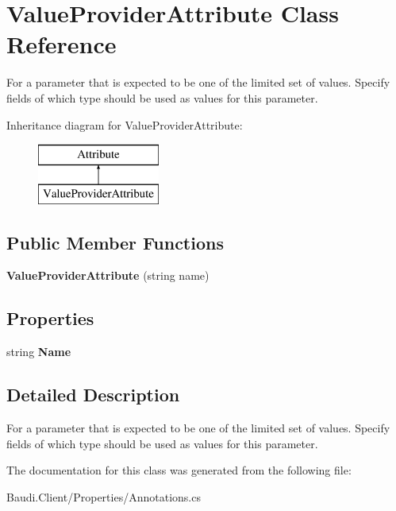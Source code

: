 \hypertarget{class_value_provider_attribute}{}\section{Value\+Provider\+Attribute Class Reference}
\label{class_value_provider_attribute}


For a parameter that is expected to be one of the limited set of values. Specify fields of which type should be used as values for this parameter.  


Inheritance diagram for Value\+Provider\+Attribute\+:\begin{figure}[H]
\begin{center}
\leavevmode
\includegraphics[height=2.000000cm]{class_value_provider_attribute}
\end{center}
\end{figure}
\subsection*{Public Member Functions}
\begin{DoxyCompactItemize}
\item 
\hypertarget{class_value_provider_attribute_a00abe8fdb0c50afa23f3c14688b0fe9f}{}{\bfseries Value\+Provider\+Attribute} (string name)\label{class_value_provider_attribute_a00abe8fdb0c50afa23f3c14688b0fe9f}

\end{DoxyCompactItemize}
\subsection*{Properties}
\begin{DoxyCompactItemize}
\item 
\hypertarget{class_value_provider_attribute_a954d0ecb3682e337a4c174d238bdd892}{}string {\bfseries Name}\label{class_value_provider_attribute_a954d0ecb3682e337a4c174d238bdd892}

\end{DoxyCompactItemize}


\subsection{Detailed Description}
For a parameter that is expected to be one of the limited set of values. Specify fields of which type should be used as values for this parameter. 



The documentation for this class was generated from the following file\+:\begin{DoxyCompactItemize}
\item 
Baudi.\+Client/\+Properties/Annotations.\+cs\end{DoxyCompactItemize}
